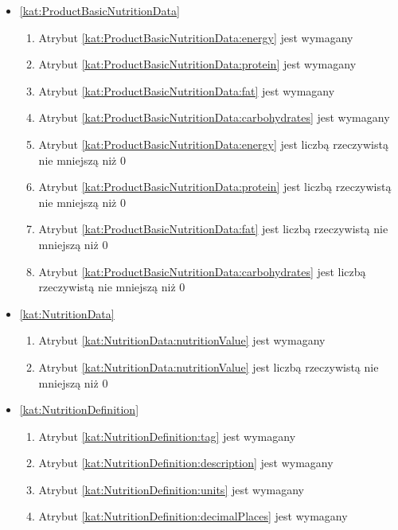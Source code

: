 \begin{itemize}[label={\textbf{Ograniczenia dla}}, wide, labelwidth=!, labelindent=0pt]
    \item\ref{kat:ProductBasicNutritionData}
    \begin{enumerate}[label={\textbf{OGR/\protect\threedigits{\arabic{enumi}}}}, wide, labelwidth=!, align=left, leftmargin=3cm, resume]
        \item Atrybut \ref{kat:ProductBasicNutritionData:energy} jest wymagany
        \item Atrybut \ref{kat:ProductBasicNutritionData:protein} jest wymagany
        \item Atrybut \ref{kat:ProductBasicNutritionData:fat} jest wymagany
        \item Atrybut \ref{kat:ProductBasicNutritionData:carbohydrates} jest wymagany

        \item Atrybut \ref{kat:ProductBasicNutritionData:energy} jest liczbą rzeczywistą nie mniejszą niż 0
        \item Atrybut \ref{kat:ProductBasicNutritionData:protein} jest liczbą rzeczywistą nie mniejszą niż 0
        \item Atrybut \ref{kat:ProductBasicNutritionData:fat} jest liczbą rzeczywistą nie mniejszą niż 0
        \item Atrybut \ref{kat:ProductBasicNutritionData:carbohydrates} jest liczbą rzeczywistą nie mniejszą niż 0
    \end{enumerate}

    \item\ref{kat:NutritionData}
    \begin{enumerate}[label={\textbf{OGR/\protect\threedigits{\arabic{enumi}}}}, wide, labelwidth=!, align=left, leftmargin=3cm, resume]
        \item Atrybut \ref{kat:NutritionData:nutritionValue} jest wymagany

        \item Atrybut \ref{kat:NutritionData:nutritionValue} jest liczbą rzeczywistą nie mniejszą niż 0
    \end{enumerate}

    \item\ref{kat:NutritionDefinition}
    \begin{enumerate}[label={\textbf{OGR/\protect\threedigits{\arabic{enumi}}}}, wide, labelwidth=!, align=left, leftmargin=3cm, resume]
        \item Atrybut \ref{kat:NutritionDefinition:tag} jest wymagany
        \item Atrybut \ref{kat:NutritionDefinition:description} jest wymagany
        \item Atrybut \ref{kat:NutritionDefinition:units} jest wymagany
        \item Atrybut \ref{kat:NutritionDefinition:decimalPlaces} jest wymagany


\end{enumerate}
\end{itemize}
